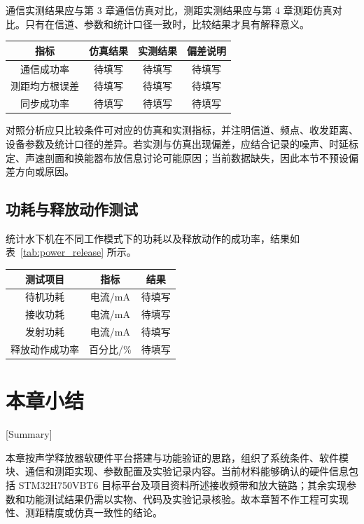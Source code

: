 通信实测结果应与第 3 章通信仿真对比，测距实测结果应与第 4 章测距仿真对比。只有在信道、参数和统计口径一致时，比较结果才具有解释意义。

\begin{table}[htbp]
  \vspace{0.5em}\centering\wuhao
  \begin{tabular}{cccc}
    \toprule[1.5pt]
    指标 & 仿真结果 & 实测结果 & 偏差说明 \\
    \midrule[1pt]
    通信成功率 & 待填写 & 待填写 & 待填写 \\
    测距均方根误差 & 待填写 & 待填写 & 待填写 \\
    同步成功率 & 待填写 & 待填写 & 待填写 \\
    \bottomrule[1.5pt]
  \end{tabular}
\end{table}

对照分析应只比较条件可对应的仿真和实测指标，并注明信道、频点、收发距离、设备参数及统计口径的差异。若实测与仿真出现偏差，应结合记录的噪声、时延标定、声速剖面和换能器布放信息讨论可能原因；当前数据缺失，因此本节不预设偏差方向或原因。

\subsection{功耗与释放动作测试}

统计水下机在不同工作模式下的功耗以及释放动作的成功率，结果如表~\ref{tab:power_release} 所示。

\begin{table}[htbp]
  \vspace{0.5em}\centering\wuhao
  \begin{tabular}{ccc}
    \toprule[1.5pt]
    测试项目 & 指标 & 结果 \\
    \midrule[1pt]
    待机功耗 & 电流/mA & 待填写 \\
    接收功耗 & 电流/mA & 待填写 \\
    发射功耗 & 电流/mA & 待填写 \\
    释放动作成功率 & 百分比/\% & 待填写 \\
    \bottomrule[1.5pt]
  \end{tabular}
\end{table}

\section{本章小结}[Summary]

本章按声学释放器软硬件平台搭建与功能验证的思路，组织了系统条件、软件模块、通信和测距实现、参数配置及实验记录内容。当前材料能够确认的硬件信息包括 STM32H750VBT6 目标平台及项目资料所述接收频带和放大链路；其余实现参数和功能测试结果仍需以实物、代码及实验记录核验。故本章暂不作工程可实现性、测距精度或仿真一致性的结论。
